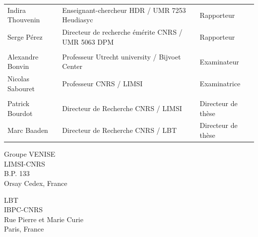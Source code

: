 \begin{titlepage}
\begin{center}
\begin{tabular}{l l l}
	Indira Thouvenin 	& Enseignant-chercheur HDR / UMR 7253 Heudiasyc		& Rapporteur\\ 
	Serge Pérez		& Directeur de recherche émérite CNRS / UMR 5063 DPM		& Rapporteur\\ %
	& &\\
	Alexandre Bonvin	& Professeur Utrecht university / Bijvoet Center	 	& Examinateur\\ 
	Nicolas Sabouret	& Professeur CNRS / LIMSI				& Examinatrice\\ 
	& &\\	
	Patrick Bourdot 	& Directeur de Recherche CNRS / LIMSI				& Directeur de thèse\\ 
	Marc Baaden 	& Directeur de Recherche CNRS / LBT				& Directeur de thèse\\ 
	
	\end{tabular}
\end{center}






\setlength{\columnsep}{7mm}
\setlength{\columnseprule}{0pt}

\begin{multicols}{2} 
\small 
\noindent Groupe VENISE	\\	
\noindent LIMSI-CNRS					\\
\noindent B.P. 133				\\
 Orsay Cedex, France \\	

\columnbreak

\raggedleft LBT \\
\noindent IBPC-CNRS \\
 Rue Pierre et Marie Curie  \\
 Paris, France
\end{multicols}



\end{titlepage}